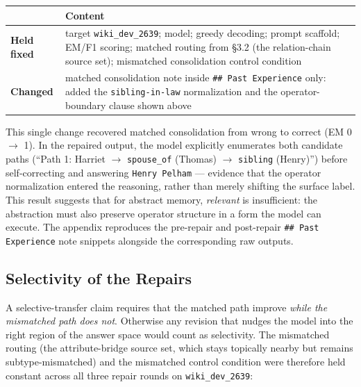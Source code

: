 \documentclass[11pt]{article}
\begin{document}
\begin{center}
\begin{tabularx}{\textwidth}{>{\raggedright\arraybackslash}p{}Y}
\toprule
 & Content \\
\midrule
\textbf{Held fixed} & target \texttt{wiki\_dev\_2639}; model; greedy decoding; prompt scaffold; EM/F1 scoring; matched routing from \S3.2 (the relation-chain source set); mismatched consolidation control condition \\
\textbf{Changed} & matched consolidation note inside \texttt{\#\# Past Experience} only: added the \texttt{sibling-in-law} normalization and the operator-boundary clause shown above \\
\bottomrule
\end{tabularx}
\end{center}

This single change recovered matched consolidation from wrong to correct (EM 0 $\rightarrow$ 1). In the repaired output, the model explicitly enumerates both candidate paths (``Path 1: Harriet $\rightarrow$ \texttt{spouse\_of} (Thomas) $\rightarrow$ \texttt{sibling} (Henry)'') before self-correcting and answering \texttt{Henry Pelham} --- evidence that the operator normalization entered the reasoning, rather than merely shifting the surface label. This result suggests that for abstract memory, \emph{relevant} is insufficient: the abstraction must also preserve operator structure in a form the model can execute. The appendix reproduces the pre-repair and post-repair \texttt{\#\# Past Experience} note snippets alongside the corresponding raw outputs.

\subsection{Selectivity of the Repairs}

A selective-transfer claim requires that the matched path improve \emph{while the mismatched path does not}. Otherwise any revision that nudges the model into the right region of the answer space would count as selectivity. The mismatched routing (the attribute-bridge source set, which stays topically nearby but remains subtype-mismatched) and the mismatched control condition were therefore held constant across all three repair rounds on \texttt{wiki\_dev\_2639}:
\end{document}
